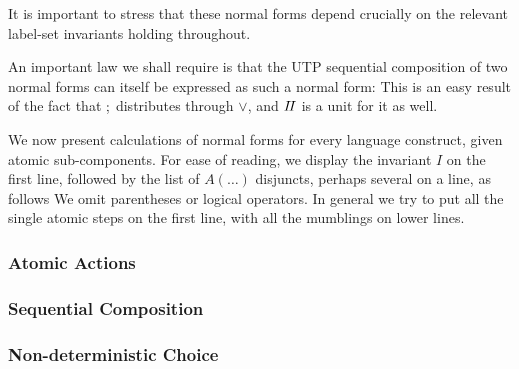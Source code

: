 It is important to stress that these normal forms depend crucially
on the relevant label-set invariants holding throughout.

An important law we shall require is that the UTP sequential
composition of two normal forms can itself be expressed
as such a normal form:
This is an easy result of the fact that $\mathrel{;}$ distributes through $\lor$,
and $I\!I$ is a unit for it as well.


We now present calculations of normal forms for every language
construct, given atomic sub-components.
For ease of reading,
we display the invariant $I$ on the first line,
followed by the list of $A(\dots)$ disjuncts, perhaps several on a line,
as follows
We omit parentheses or logical operators.
In general we try to put all the single atomic steps on the first line,
with all the mumblings on lower lines.

\subsubsection{Atomic Actions}

\subsubsection{Sequential Composition}

\subsubsection{Non-deterministic Choice}

